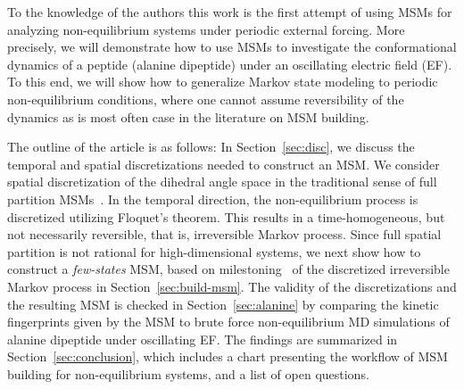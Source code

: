 \documentclass[journal=jctcce,manuscript=article]{achemso}
\begin{document}
To the knowledge of the authors this work is the first attempt of using MSMs for analyzing non-equilibrium systems under periodic external forcing.
More precisely, we will demonstrate how to use MSMs to investigate the conformational dynamics of a peptide (alanine dipeptide) under an oscillating electric field (EF).
To this end, we will show how to generalize Markov state modeling to periodic non-equilibrium conditions, where one cannot assume reversibility of the dynamics as is most often case in the literature on MSM building.

The outline of the article is as follows: 
In Section~\ref{sec:disc}, we discuss the temporal and spatial
discretizations needed to construct an MSM. We consider spatial discretization
of the dihedral angle space in the traditional sense of full partition MSMs~\cite{pande2010everything,A19-29}.
In the temporal direction, the non-equilibrium process
is discretized utilizing Floquet's theorem. This results in a time-homogeneous, 
but not necessarily reversible, that is, irreversible Markov process. Since  full spatial partition is not rational
for high-dimensional systems, we next show how to construct a \emph{few-states} MSM, based on milestoning~\cite{schuette2011markov,A19-29} of the discretized irreversible Markov process in Section~\ref{sec:build-msm}.
The validity of the discretizations and the resulting MSM is checked in Section~\ref{sec:alanine}
by comparing the kinetic fingerprints given by the MSM to brute force
non-equilibrium MD simulations of alanine dipeptide under oscillating EF.
The findings are summarized in Section~\ref{sec:conclusion}, which includes a chart presenting
the workflow of MSM building for non-equilibrium systems, and a list of open questions.



\end{document}
